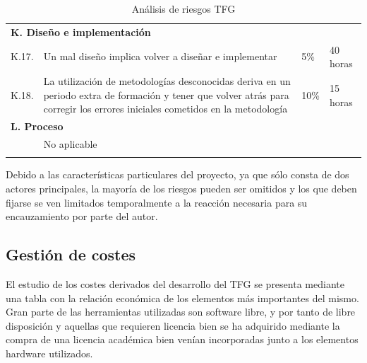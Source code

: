 \begin{longtable}{p{1cm} p{8cm} p{3cm} p{2cm}}
		\multicolumn{4}{l}{\cellcolor{gray!25}\textbf{K. Diseño e implementación}}\\
		K.17. &Un mal diseño implica volver a diseñar e implementar							&	5\%		&	40 horas\\
		K.18. &La utilización de metodologías desconocidas deriva en un periodo extra de formación y tener que volver atrás para corregir los errores iniciales cometidos en la metodología										&	10\%	&	15 horas\\
		
		\multicolumn{4}{l}{\cellcolor{gray!25}\textbf{L. Proceso}}\\	
		&No aplicable&&\\
	    \hline
		
		
	  \caption{Análisis de riesgos \ac{TFG}}
	  \label{tab:riesgos}
	\end{longtable}
	
	
	Debido a las características particulares del proyecto, ya que sólo consta de dos actores principales, la mayoría de los riesgos pueden ser omitidos y los que deben fijarse se ven limitados temporalmente a la reacción necesaria para su encauzamiento por parte del autor.
	
	\subsection{Gestión de costes}
	El estudio de los costes derivados del desarrollo del \ac{TFG} se presenta mediante una tabla con la relación económica de los elementos más importantes del mismo. Gran parte de las herramientas utilizadas son software libre, y por tanto de libre disposición y aquellas que requieren licencia bien se ha adquirido mediante la compra de una licencia académica bien venían incorporadas junto a los elementos hardware utilizados. 
	
